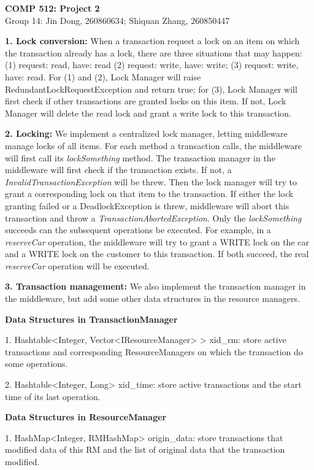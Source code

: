 \documentclass[a4paper, 11pt]{ctexart}
\title{}
\author{Jin Dong}
\newcommand{\newAssignment}[2]{
	\begin{center}
  		\textbf{{\huge #1}}\vspace{10pt} \\
  		{\large #2}\vspace{15pt}
	\end{center}
}
\newcommand{\newQuestion}[1]{\vspace{5pt}\textbf{\Large #1}}
\newcommand{\newPart}[1]{\textbf{\large #1}}
\begin{document}
\newAssignment{COMP 512: Project 2 }{Group 14: Jin Dong, 260860634; Shiquan Zhang, 260850447}

\newQuestion{1. Lock conversion:} When a transaction request a lock on an item on which the transaction already has a lock, there are three situations that may happen: (1) request: read, have: read (2) request: write, have: write; (3) request: write, have: read. For (1) and (2), Lock Manager will raise RedundantLockRequestException and return true; for (3), Lock Manager will first check if other transactions are granted locks on this item. If not, Lock Manager will delete the read lock and grant a write lock to this transaction.

\newQuestion{2. Locking:} We implement a centralized lock manager, letting middleware manage locks of all items. For each method a transaction calls, the middleware will first call its \textit{lockSomething} method. The transaction manager in the middleware will first check if the transaction exists. If not, a \textit{InvalidTransactionException} will be threw. Then the lock manager will try to grant a corresponding lock on that item to the transaction. If either the lock granting failed or a DeadlockException is threw, middleware will abort this transaction and throw a \textit{TransactionAbortedException}. Only the \textit{lockSomething} succeeds can the subsequent operations be executed. For example, in a \textit{reserveCar} operation, the middleware will try to grant a WRITE lock on the car and  a WRITE lock on the customer to this transaction. If both succeed, the real \textit{reserveCar} operation will be executed.

\newQuestion{3. Transaction management:} We also implement the transaction manager in the middleware, but add some other data structures in the resource managers.

\newPart{Data Structures in TransactionManager}

1. Hashtable<Integer, Vector<IResourceManager> > xid\_rm: store active transactions and corresponding ResourceManagers on which the transaction do some operations.

2. Hashtable<Integer, Long> xid\_time: store active transactions and the start time of its last operation.

\newPart{Data Structures in ResourceManager}

1. HashMap<Integer, RMHashMap> origin\_data: store transactions that modified data of this RM and the list of original data that the transaction modified.
\end{document}
